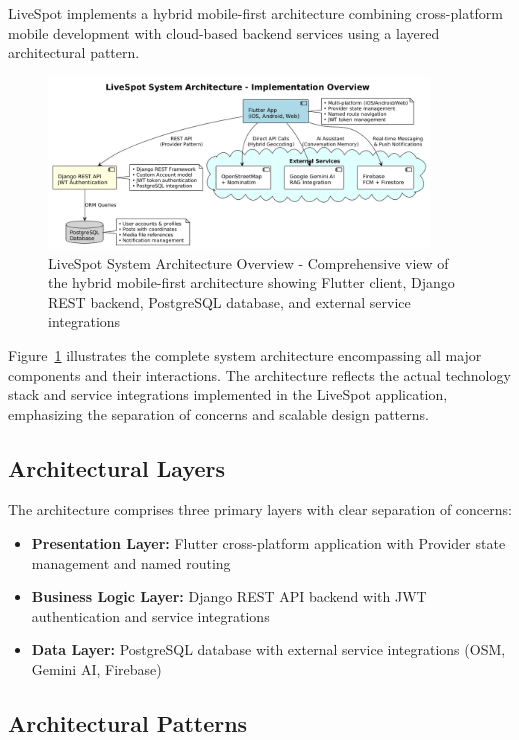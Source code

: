 LiveSpot implements a hybrid mobile-first architecture combining cross-platform mobile development with cloud-based backend services using a layered architectural pattern.

\begin{figure}[h!]
    \centering
    \includegraphics[width=0.9\textwidth]{figures/system_architecture}
    \caption{LiveSpot System Architecture Overview - Comprehensive view of the hybrid mobile-first architecture showing Flutter client, Django REST backend, PostgreSQL database, and external service integrations}
    \label{fig:system_architecture}
\end{figure}

Figure~\ref{fig:system_architecture} illustrates the complete system architecture encompassing all major components and their interactions. The architecture reflects the actual technology stack and service integrations implemented in the LiveSpot application, emphasizing the separation of concerns and scalable design patterns.

\subsection{Architectural Layers}

The architecture comprises three primary layers with clear separation of concerns:

\begin{itemize}
    \item \textbf{Presentation Layer:} Flutter cross-platform application with Provider state management and named routing
    \item \textbf{Business Logic Layer:} Django REST API backend with JWT authentication and service integrations
    \item \textbf{Data Layer:} PostgreSQL database with external service integrations (OSM, Gemini AI, Firebase)
\end{itemize}

\subsection{Architectural Patterns}

